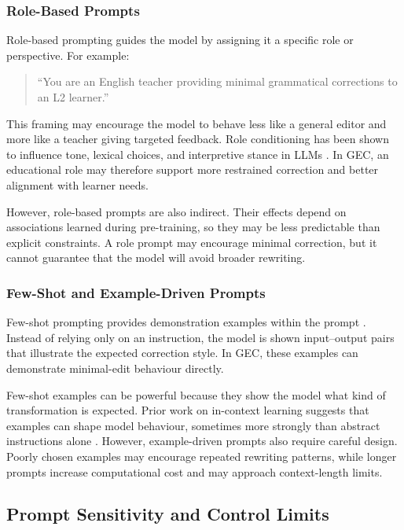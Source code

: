 \subsubsection{Role-Based Prompts}

Role-based prompting guides the model by assigning it a specific role or perspective. For example:

\begin{quote}
``You are an English teacher providing minimal grammatical corrections to an L2 learner.''
\end{quote}

This framing may encourage the model to behave less like a general editor and more like a teacher giving targeted feedback. Role conditioning has been shown to influence tone, lexical choices, and interpretive stance in LLMs \cite{wei2022finetuned,liu2023pretrain}. In GEC, an educational role may therefore support more restrained correction and better alignment with learner needs.

However, role-based prompts are also indirect. Their effects depend on associations learned during pre-training, so they may be less predictable than explicit constraints. A role prompt may encourage minimal correction, but it cannot guarantee that the model will avoid broader rewriting.

\subsubsection{Few-Shot and Example-Driven Prompts}

Few-shot prompting provides demonstration examples within the prompt \cite{NEURIPS2020_1457c0d6}. Instead of relying only on an instruction, the model is shown input--output pairs that illustrate the expected correction style. In GEC, these examples can demonstrate minimal-edit behaviour directly.

Few-shot examples can be powerful because they show the model what kind of transformation is expected. Prior work on in-context learning suggests that examples can shape model behaviour, sometimes more strongly than abstract instructions alone \cite{liu2023pretrain}. However, example-driven prompts also require careful design. Poorly chosen examples may encourage repeated rewriting patterns, while longer prompts increase computational cost and may approach context-length limits.

\subsection{Prompt Sensitivity and Control Limits}

